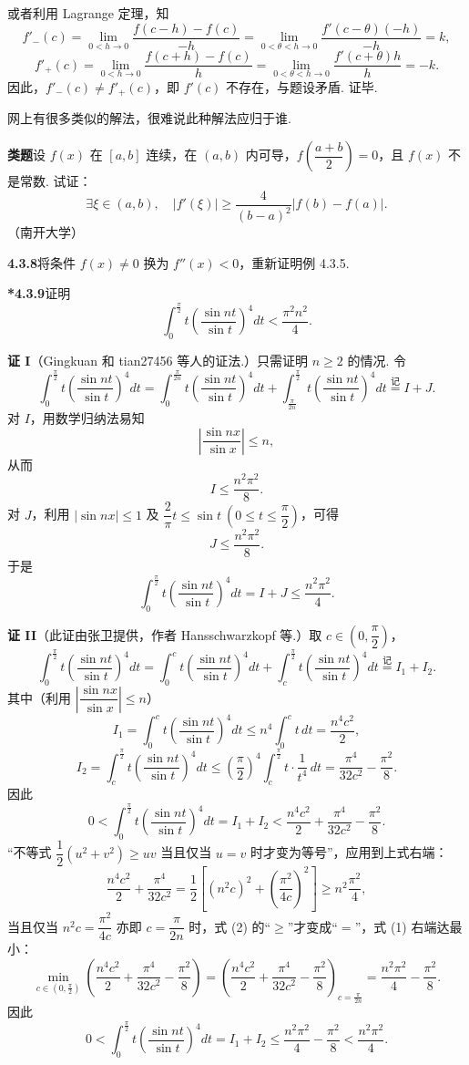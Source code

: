 \documentclass[UTF8, 12pt, fontset=fandol, oneside]{ctexart}
\begin{document}
或者利用 Lagrange 定理，知
\[
f'_-(c)=\lim_{0<h\to0}\frac{f(c-h)-f(c)}{-h}
=\lim_{0<\theta<h\to0}\frac{f'(c-\theta)(-h)}{-h}=k,
\]
\[
f'_+(c)=\lim_{0<h\to0}\frac{f(c+h)-f(c)}{h}
=\lim_{0<\theta<h\to0}\frac{f'(c+\theta)h}{h}=-k.
\]
因此，$f'_-(c)\ne f'_+(c)$，即 $f'(c)$ 不存在，与题设矛盾. 证毕.

网上有很多类似的解法，很难说此种解法应归于谁.

\noindent\textbf{类题}\quad 设 $f(x)$ 在 $[a,b]$ 连续，在 $(a,b)$ 内可导，$f\left(\dfrac{a+b}2\right)=0$，且 $f(x)$ 不是常数. 试证：
\[
\exists\xi\in(a,b),\quad
|f'(\xi)|\ge\frac4{(b-a)^2}|f(b)-f(a)|.
\]
（南开大学）

\noindent\textbf{4.3.8}\quad 将条件 $f(x)\ne0$ 换为 $f''(x)<0$，重新证明例 4.3.5.

\noindent\textbf{*4.3.9}\quad 证明
\[
\int_0^{\frac\pi2}t\left(\frac{\sin nt}{\sin t}\right)^4dt<\frac{\pi^2n^2}{4}.
\]

\noindent\textbf{证 I}\quad （Gingkuan 和 tian27456 等人的证法.）只需证明 $n\ge2$ 的情况. 令
\[
\int_0^{\frac\pi2}t\left(\frac{\sin nt}{\sin t}\right)^4dt
=\int_0^{\frac\pi{2n}}t\left(\frac{\sin nt}{\sin t}\right)^4dt
+\int_{\frac\pi{2n}}^{\frac\pi2}t\left(\frac{\sin nt}{\sin t}\right)^4dt
\stackrel{\text{记}}{=}I+J.
\]
对 $I$，用数学归纳法易知
\[
\left|\frac{\sin nx}{\sin x}\right|\le n,
\]
从而
\[
I\le\frac{n^2\pi^2}{8}.
\]
对 $J$，利用 $|\sin nx|\le1$ 及 $\dfrac2\pi t\le\sin t\ (0\le t\le\dfrac\pi2)$，可得
\[
J\le\frac{n^2\pi^2}{8}.
\]
于是
\[
\int_0^{\frac\pi2}t\left(\frac{\sin nt}{\sin t}\right)^4dt
=I+J\le\frac{n^2\pi^2}{4}.
\]

\noindent\textbf{证 II}\quad （此证由张卫提供，作者 Hansschwarzkopf 等.）取 $c\in\left(0,\dfrac\pi2\right)$，
\[
\int_0^{\frac\pi2}t\left(\frac{\sin nt}{\sin t}\right)^4dt
=\int_0^c t\left(\frac{\sin nt}{\sin t}\right)^4dt
+\int_c^{\frac\pi2}t\left(\frac{\sin nt}{\sin t}\right)^4dt
\stackrel{\text{记}}{=}I_1+I_2.
\]
其中（利用 $\left|\dfrac{\sin nx}{\sin x}\right|\le n$）
\[
I_1=\int_0^c t\left(\frac{\sin nt}{\sin t}\right)^4dt
\le n^4\int_0^c t\,dt=\frac{n^4c^2}{2},
\]
\[
I_2=\int_c^{\frac\pi2}t\left(\frac{\sin nt}{\sin t}\right)^4dt
\le\left(\frac\pi2\right)^4\int_c^{\frac\pi2}t\cdot\frac1{t^4}\,dt
=\frac{\pi^4}{32c^2}-\frac{\pi^2}{8}.
\]
因此
\[
0<\int_0^{\frac\pi2}t\left(\frac{\sin nt}{\sin t}\right)^4dt
=I_1+I_2<\frac{n^4c^2}{2}+\frac{\pi^4}{32c^2}-\frac{\pi^2}{8}.
\tag{1}
\]
“不等式 $\dfrac12(u^2+v^2)\ge uv$ 当且仅当 $u=v$ 时才变为等号”，应用到上式右端：
\[
\frac{n^4c^2}{2}+\frac{\pi^4}{32c^2}
=\frac12\left[(n^2c)^2+\left(\frac{\pi^2}{4c}\right)^2\right]\ge n^2\frac{\pi^2}{4},
\tag{2}
\]
当且仅当 $n^2c=\dfrac{\pi^2}{4c}$ 亦即 $c=\dfrac\pi{2n}$ 时，式 (2) 的“$\ge$”才变成“$=$”，式 (1) 右端达最小：
\[
\min_{c\in(0,\frac\pi2)}
\left(\frac{n^4c^2}{2}+\frac{\pi^4}{32c^2}-\frac{\pi^2}{8}\right)
=\left(\frac{n^4c^2}{2}+\frac{\pi^4}{32c^2}-\frac{\pi^2}{8}\right)_{c=\frac\pi{2n}}
=\frac{n^2\pi^2}{4}-\frac{\pi^2}{8}.
\]
因此
\[
0<\int_0^{\frac\pi2}t\left(\frac{\sin nt}{\sin t}\right)^4dt
=I_1+I_2\le\frac{n^2\pi^2}{4}-\frac{\pi^2}{8}
<\frac{n^2\pi^2}{4}.
\]
\end{document}
